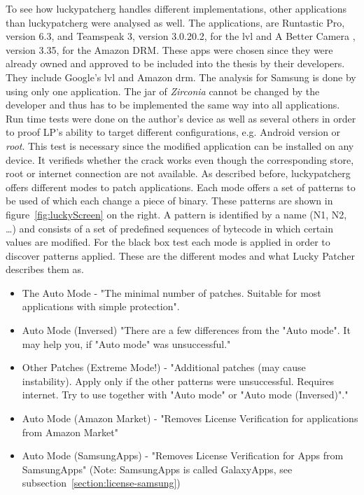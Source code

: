 \newline
To see how \gls{luckypatcherg} handles different implementations, other applications than \gls{luckypatcherg} were analysed as well.
The applications, are Runtastic Pro\cite{runtasticApp}, version 6.3, and Teamspeak 3\cite{teamspeakApp}, version 3.0.20.2, for the \gls{lvl} and A Better Camera \cite{abettercamera}, version 3.35, for the Amazon DRM.
These apps were chosen since they were already owned and approved to be included into the thesis by their developers.
They include Google's \gls{lvl} and Amazon \gls{drm}.
The analysis for Samsung is done by using only one application.
The \gls{jar} of \textit{Zirconia} cannot be changed by the developer and thus has to be implemented the same way into all applications.
\newline
Run time tests were done on the author's device as well as several others in order to proof LP's ability to target different configurations, e.g. Android version or \textit{root}.
This test is necessary since the modified application can be installed on any device.
It verifieds whether the crack works even though the corresponding store, root or internet connection are not available.
\newline
As described before, \gls{luckypatcherg} offers different modes to patch applications.
Each mode offers a set of patterns to be used of which each change a piece of binary.
These patterns are shown in figure~\ref{fig:luckyScreen} on the right.
A pattern is identified by a name (N1, N2, …) and consists of a set of predefined sequences of bytecode in which certain values are modified.
For the black box test each mode is applied in order to discover patterns applied.
\newline
These are the different modes and what Lucky Patcher describes them as.
\begin{itemize}
\item The Auto Mode - "The minimal number of patches. Suitable for most applications with simple protection".
\item Auto Mode (Inversed) "There are a few differences from the "Auto mode". It may help you, if "Auto mode" was unsuccessful."
\item Other Patches (Extreme Mode!) - "Additional patches (may cause instability). Apply only if the other patterns were unsuccessful. Requires internet. Try to use together with "Auto mode" or "Auto mode (Inversed)"."
\item Auto Mode (Amazon Market) - "Removes License Verification for applications from Amazon Market"
\item Auto Mode (SamsungApps) - "Removes License Verification for Apps from SamsungApps" (Note: SamsungApps is called GalaxyApps, see subsection~\ref{section:license-samsung})
\end{itemize}
